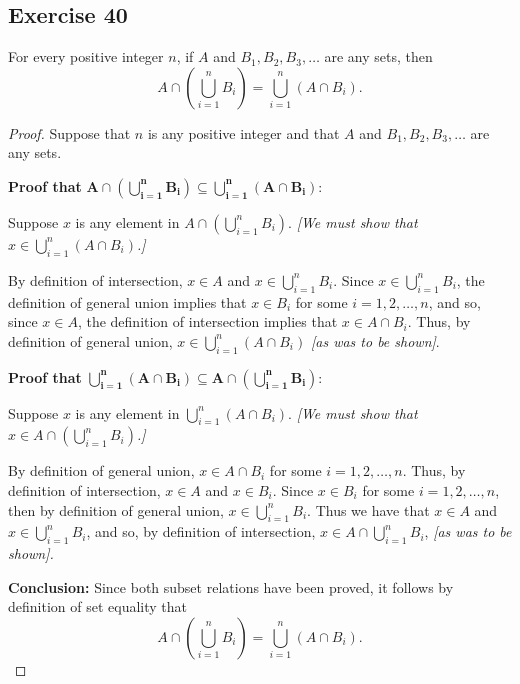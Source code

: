 \documentclass[14pt]{extarticle}
\newcommand{\dps}{\displaystyle}
\begin{document}
\subsection{Exercise 40}
For every positive integer $n$, if $A$ and \(B_1, B_2, B_3, \ldots\) are any sets, then
\[
  A \cap \left(\bigcup_{i=1}^n B_i\right) = \bigcup_{i=1}^n (A \cap B_i).
\]
\begin{proof}
  Suppose that $n$ is any positive integer and that $A$ and \(B_1, B_2, B_3, \ldots\) are any sets.

    {\bf Proof that} \(\bm{A \cap \left(\bigcup_{i=1}^n B_i\right) \subseteq \bigcup_{i=1}^n (A \cap B_i):}\)

  Suppose $x$ is any element in \(\dps A \cap \left( \bigcup_{i=1}^n B_i\right)\).
    {\it [We must show that \(\dps x \in \bigcup_{i=1}^n (A \cap B_i)\).]}

  By definition of intersection, $x \in A$ and \(\dps x \in \bigcup_{i=1}^n B_i\). Since \(\dps x \in \bigcup_{i=1}^n
  B_i\), the definition of general union implies that \(x \in B_i\) for some \(i = 1, 2, \ldots, n\), and so, since \(x
  \in A\), the definition of intersection implies that \(x \in A \cap B_i\). Thus, by definition of general union,
  \(\dps x \in \bigcup_{i=1}^n (A \cap B_i)\) {\it [as was to be shown]}.

  {\bf Proof that} \(\bm{\bigcup_{i=1}^n (A \cap B_i) \subseteq A \cap \left(\bigcup_{i=1}^n B_i\right):}\)

  Suppose $x$ is any element in \(\dps \bigcup_{i=1}^n (A \cap B_i)\).
    {\it [We must show that \(\dps x \in A \cap \left( \bigcup_{i=1}^n B_i\right)\).]}

  By definition of general union, \(x \in A \cap B_i\) for some \(i = 1, 2, \ldots, n\). Thus, by definition of
  intersection, \(x \in A\) and \(x \in B_i\). Since \(x \in B_i\) for some \(i = 1, 2, \ldots, n\), then by definition
  of general union, \(\dps x \in \bigcup_{i=1}^n B_i\). Thus we have that \(x \in A\) and \(\dps x \in \bigcup_{i=1}^n
  B_i\), and so, by definition of intersection, \(\dps x \in A \cap \bigcup_{i=1}^n B_i\), {\it [as was to be shown].}

    {\bf Conclusion:} Since both subset relations have been proved, it follows by definition of set equality that
  \[
    A \cap \left(\bigcup_{i=1}^n B_i\right) = \bigcup_{i=1}^n (A \cap B_i).
  \]
\end{proof}
\end{document}

